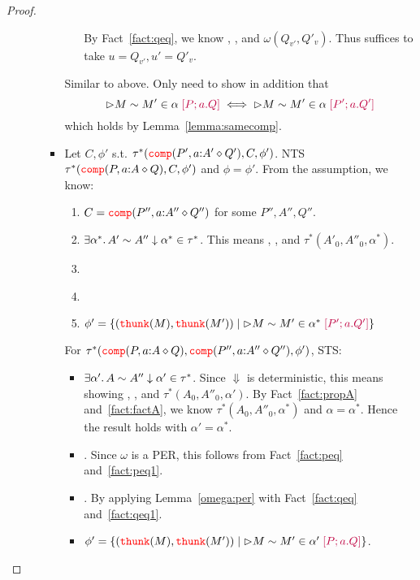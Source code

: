 \begin{proof}
\begin{enumerate}
\begin{itemize}
\begin{itemize}
\begin{itemize}
             By Fact~\ref{fact:qeq}, we know , 
             , and $\omega(Q_{v'}, Q'_v)$. Thus suffices to take 
             $u = Q_{v'}, u' = Q'_v$.
        \end{itemize}
        Similar to above. Only need to show in addition that
        \[ \rhd M \sim M' \in \alpha\; {\color{purple}{[P; a.Q]}} \iff  \rhd M \sim M' \in \alpha\; {\color{purple}{[P'; a.Q']}}\]
        which holds by Lemma~\ref{lemma:samecomp}.
      \item Let $C, \phi'$ s.t. $\tau^*({\color{red}{\mathtt{comp}}}(P', a {:} A' \diamond Q'),C,\phi')$. NTS
        $\tau^*({\color{red}{\mathtt{comp}}}(P, a {:} A \diamond Q),C,\phi')$ and $\phi = \phi'$.
        From the assumption, we know:
        \begin{enumerate}
          \item $C = {\color{red}{\mathtt{comp}}}(P'', a {:} A'' \diamond Q'')$ for some $P'',A'',Q''$.
          \item $\exists \alpha^*.\, A' \sim A'' \downarrow \alpha^* \in \tau^*$. This means  
            , , and $\tau^*(A'_0,A''_0,\alpha^*)$. 
            \label{fact:factA}
          \item {} \label{fact:peq1}
          \item {} \label{fact:qeq1}
          \item $\phi' = \{({\color{red}{\mathtt{thunk}}}(M), {\color{red}{\mathtt{thunk}}}(M')) \mid 
             \rhd M \sim M' \in \alpha^*\; {\color{purple}{[P'; a.Q']}}
            \}$ \label{fact:phiprime}
        \end{enumerate}
        For $\tau^*({\color{red}{\mathtt{comp}}}(P, a {:} A \diamond Q), {\color{red}{\mathtt{comp}}}(P'', a {:} A'' \diamond Q''),\phi')$, 
        STS:
        \begin{itemize}
          \item $\exists \alpha'.\, A \sim A'' \downarrow \alpha' \in \tau^*$. 
            Since $\Downarrow$ is deterministic, this means showing 
            , , and $\tau^*(A_0,A''_0,\alpha')$.
            By Fact~\ref{fact:propA} and~\ref{fact:factA}, we know 
            $\tau^*(A_0,A''_0,\alpha^*)$ and $\alpha = \alpha^*$.
            Hence the result holds with $\alpha' = \alpha^*$.
          \item {}. Since $\omega$ is a PER, this follows from
            Fact~\ref{fact:peq} and~\ref{fact:peq1}.
          \item {}. By applying 
            Lemma~\ref{omega:per} with Fact~\ref{fact:qeq} and~\ref{fact:qeq1}.
          \item $\phi' = \{({\color{red}{\mathtt{thunk}}}(M), {\color{red}{\mathtt{thunk}}}(M')) \mid 
             \rhd M \sim M' \in \alpha'\; {\color{purple}{[P; a.Q]}}
            \}$.


\end{itemize}
\end{itemize}
\end{itemize}
\end{enumerate}
\end{proof}
